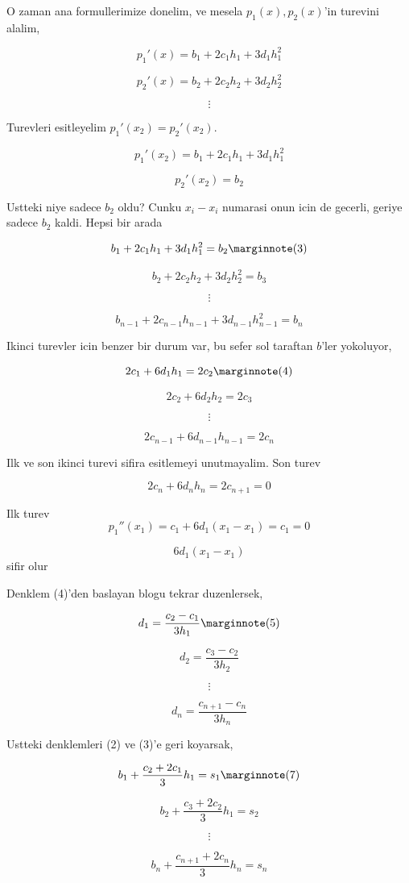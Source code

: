 \documentclass[12pt,fleqn]{article}\usepackage{../common}
\begin{document}
O zaman ana formullerimize donelim, ve mesela $p_1(x),p_2(x)$'in turevini
alalim,

$$ p_1'(x) = b_1 + 2c_1h_1 + 3d_1h_1^2 $$

$$ p_2'(x) = b_2 + 2c_2h_2 + 3d_2h_2^2 $$

$$ \vdots $$

Turevleri esitleyelim $p_1'(x_2) = p_2'(x_2)$. 

$$ p_1'(x_2) = b_1 + 2c_1h_1 + 3d_1h_1^2 $$

$$  p_2'(x_2) = b_2 $$

Ustteki niye sadece $b_2$ oldu? Cunku $x_i-x_i$ numarasi onun icin de
gecerli, geriye sadece $b_2$ kaldi. Hepsi bir arada

$$  b_1 + 2c_1h_1 + 3d_1h_1^2  = b_2 
\mlabel{3}$$

$$  b_2 + 2c_2h_2 + 3d_2h_2^2 = b_3 $$

$$ \vdots $$

$$  b_{n-1} + 2c_{n-1}h_{n-1} + 3d_{n-1}h_{n-1}^2 =  b_n $$

Ikinci turevler icin benzer bir durum var, bu sefer sol taraftan $b$'ler
yokoluyor, 

$$ 2c_1 + 6d_1h_1 = 2c_2 
\mlabel{4} $$

$$ 2c_2 + 6d_2h_2 = 2c_3 $$

$$ \vdots $$

$$ 2c_{n-1} + 6d_{n-1}h_{n-1} = 2c_n $$

Ilk ve son ikinci turevi sifira esitlemeyi unutmayalim. Son turev

$$ 2c_n + 6d_nh_n = 2c_{n+1} = 0 $$

Ilk turev
$$ p_1''(x_1) =  c_1 + 6d_1(x_1-x_1)  = c_1 = 0$$

$$ 6d_1(x_1-x_1) $$ sifir olur

Denklem (4)'den baslayan blogu tekrar duzenlersek, 

$$ d_1 = \frac{ c_2 - c_1}{3h_1} 
\mlabel{5} $$

$$ d_2 = \frac{ c_3 - c_2}{3h_2} $$

$$ \vdots $$

$$ d_n = \frac{ c_{n+1} - c_n}{3h_n} $$

Ustteki denklemleri (2) ve (3)'e geri koyarsak,

$$ b_1 + \frac{ c_2 + 2c_1}{3}h_1 = s_1 
\mlabel{7} $$

$$ b_2 + \frac{ c_3 + 2c_2}{3}h_1 = s_2 $$

$$ \vdots $$

$$ b_n + \frac{ c_{n+1} + 2c_n}{3}h_n = s_n $$
\end{document}
